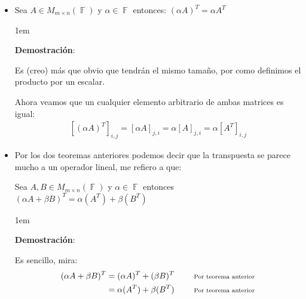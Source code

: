 \documentclass[12pt, fleqn]{report}                             %
\newenvironment{SmallIndentation}[1][0.75em]                    %
        {\begin{adjustwidth}{#1}{}\begin{footnotesize}}             %
        {\end{footnotesize}\end{adjustwidth}}                       %
\DeclareMathOperator \Space {\quad}                             %
\newcommand \Remember[1]{\Space\text{\scriptsize{#1}}}          %
\theoremstyle{break}                                            %
\DeclareMathOperator \GenericField {\mathbb{F}}                 %
\begin{document}
\begin{itemize}
\begin{SmallIndentation}[1em]
                        \end{SmallIndentation}

                    \item Sea $A \in M_{m \times n}(\GenericField)$ y $\alpha \in \GenericField$ entonces:
                        $(\alpha A)^T = \alpha A^T$
                        
                        \begin{SmallIndentation}[1em]
                            \textbf{Demostración}:

                            Es (creo) más que obvio que tendrán el mismo tamaño, por como definimos el producto
                            por un escalar.

                            Ahora veamos que un cualquier elemento arbitrario de ambas matrices es igual:
                            \begin{equation*}
                            \begin{split}
                                [(\alpha A)^T]_{i, j}    
                                    = [\alpha A]_{j, i}               
                                    = \alpha [A]_{j, i}
                                    = \alpha [A^T]_{i, j}
                            \end{split}
                            \end{equation*}

                        \end{SmallIndentation}

                    \item
                        Por los dos teoremas anteriores podemos decir que la transpuesta se parece mucho a 
                        un operador lineal, me refiero a que:

                        Sea $A,B \in M_{m \times n}(\GenericField)$ y $\alpha \in \GenericField$ entonces 
                        $(\alpha A + \beta B)^T = \alpha(A^T) + \beta(B^T)$

                        \begin{SmallIndentation}[1em]
                            \textbf{Demostración}:
                            
                            Es sencillo, mira:
                            \begin{align*}
                                (\alpha A + \beta B)^T
                                    &= (\alpha A)^T + (\beta B)^T
                                        && \Remember{Por teorema anterior} \\
                                    &= \alpha (A^T) + \beta (B^T)
                                        && \Remember{Por teorema anterior}
                            \end{align*}
                        

\end{SmallIndentation}
\end{itemize}
\end{document}
